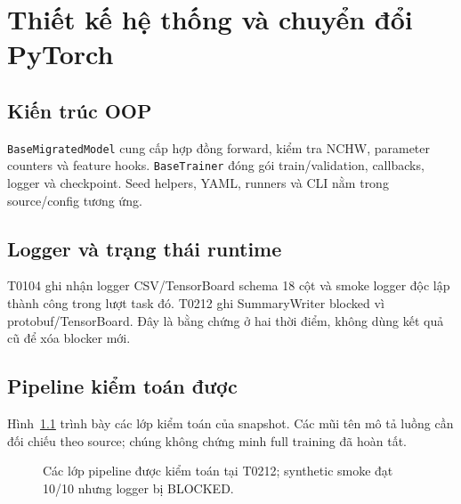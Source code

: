 \chapter{Thiết kế hệ thống và chuyển đổi PyTorch}
\section{Kiến trúc OOP}
\texttt{BaseMigratedModel} cung cấp hợp đồng forward, kiểm tra NCHW, parameter counters và feature hooks. \texttt{BaseTrainer} đóng gói train/validation, callbacks, logger và checkpoint. Seed helpers, YAML, runners và CLI nằm trong source/config tương ứng.

\section{Logger và trạng thái runtime}
T0104 ghi nhận logger CSV/TensorBoard schema 18 cột và smoke logger độc lập thành công trong lượt task đó. T0212 ghi SummaryWriter blocked vì protobuf/TensorBoard. Đây là bằng chứng ở hai thời điểm, không dùng kết quả cũ để xóa blocker mới.

\section{Pipeline kiểm toán được}
Hình~\ref{fig:btl03-pipeline} trình bày các lớp kiểm toán của snapshot. Các mũi tên mô tả luồng cần đối chiếu theo source; chúng không chứng minh full training đã hoàn tất.
\begin{figure}[htbp]
\centering
{}
\caption{Các lớp pipeline được kiểm toán tại T0212; synthetic smoke đạt 10/10 nhưng logger bị BLOCKED.}
\label{fig:btl03-pipeline}
\end{figure}

